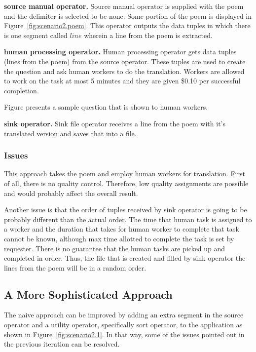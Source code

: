 \textbf{source manual operator.}
Source manual operator is supplied with the poem and the delimiter is selected to be none. Some portion of the poem is displayed in Figure~\ref{fig:scenario2.poem}. This operator outputs the data tuples in which there is one segment called $line$ wherein a line from the poem is extracted.


\textbf{human processing operator.}
Human processing operator gets data tuples (lines from the poem) from the source operator. These tuples are used to create the question and ask human workers to do the translation. Workers are allowed to work on the task at most 5 minutes and they are given \$0.10 per successful completion.

Figure presents a sample question that is shown to human workers.


\textbf{sink operator.}
Sink file operator receives a line from the poem with it's translated version and saves that into a file.


\subsubsection{Issues}
This approach takes the poem and employ human workers for translation. First of all, there is no quality control. Therefore, low quality assignments are possible and would probably affect the overall result.

Another issue is that the order of tuples received by sink operator is going to be probably different than the actual order. The time that human task is assigned to a worker and the duration that takes for human worker to complete that task cannot be known, although max time allotted to complete the task is set by requester. There is no guarantee that the human tasks are picked up and completed in order. Thus, the file that is created and filled by sink operator the lines from the poem will be in a random order.

\subsection{A More Sophisticated Approach}
The naive approach can be improved by adding an extra segment in the source operator and a utility operator, specifically sort operator, to the application as shown in Figure~\ref{fig:scenario2.1}. In that way, some of the issues pointed out in the previous iteration can be resolved.

